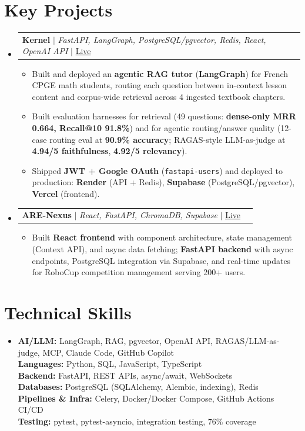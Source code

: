 \documentclass[letterpaper,9.5pt]{article}
\makeatletter
\newcommand{\resumeItem}[1]{\item\small{{#1 \vspace{-2pt}}}}
\newcommand{\resumeProjectHeading}[2]{
  \vspace{-1pt}\item
  \begin{tabular*}{1.0\textwidth}{l@{\extracolsep{\fill}}r}
  \small#1 & \textbf{\small #2}\\
  \end{tabular*}\vspace{-5pt}
}
\newcommand{\resumeItemListStart}{\begin{itemize}[leftmargin=*]\setlength\itemsep{0pt}\setlength\parsep{0pt}}
\newcommand{\resumeItemListEnd}{\end{itemize}\vspace{-4pt}}
\makeatother
\begin{document}
\section{Key Projects}
\begin{itemize}[leftmargin=0.15in, label={}]

\resumeProjectHeading
{\textbf{Kernel} $|$ \emph{FastAPI, LangGraph, PostgreSQL/pgvector, Redis, React, OpenAI API} $|$
\href{https://prepa-math-twea.vercel.app}{Live}}{}
\resumeItemListStart

\resumeItem{Built and deployed an \textbf{agentic RAG tutor} (\textbf{LangGraph}) for French CPGE math students, routing each question between in-context lesson content and corpus-wide retrieval across 4 ingested textbook chapters.}

\resumeItem{Built evaluation harnesses for retrieval (49 questions: \textbf{dense-only MRR 0.664, Recall@10 91.8\%}) and for agentic routing/answer quality (12-case routing eval at \textbf{90.9\% accuracy}; RAGAS-style LLM-as-judge at \textbf{4.94/5 faithfulness}, \textbf{4.92/5 relevancy}).}

\resumeItem{Shipped \textbf{JWT + Google OAuth} (\texttt{fastapi-users}) and deployed to production: \textbf{Render} (API + Redis), \textbf{Supabase} (PostgreSQL/pgvector), \textbf{Vercel} (frontend).}

\resumeItemListEnd

\resumeProjectHeading
  {\textbf{ARE-Nexus} $|$ \emph{React, FastAPI, ChromaDB, Supabase} $|$
  \href{https://are-nexus-ql7t.vercel.app}{Live}}{}
\resumeItemListStart
  \resumeItem{Built \textbf{React frontend} with component architecture, state management (Context API), and async data fetching; \textbf{FastAPI backend} with async endpoints, PostgreSQL integration via Supabase, and real-time updates for RoboCup competition management serving 200+ users.}
\resumeItemListEnd

\end{itemize}

\section{Technical Skills}
\begin{itemize}[leftmargin=0.15in, label={}]
  \small \item{
    \textbf{AI/LLM:} LangGraph, RAG, pgvector, OpenAI API, RAGAS/LLM-as-judge, MCP, Claude Code, GitHub Copilot \\
\textbf{Languages:} Python, SQL, JavaScript, TypeScript \\
\textbf{Backend:} FastAPI, REST APIs, async/await, WebSockets \\
\textbf{Databases:} PostgreSQL (SQLAlchemy, Alembic, indexing), Redis \\
\textbf{Pipelines \& Infra:} Celery, Docker/Docker Compose, GitHub Actions CI/CD \\
\textbf{Testing:} pytest, pytest-asyncio, integration testing, 76\% coverage \\
  }
\end{itemize}
\end{document}
